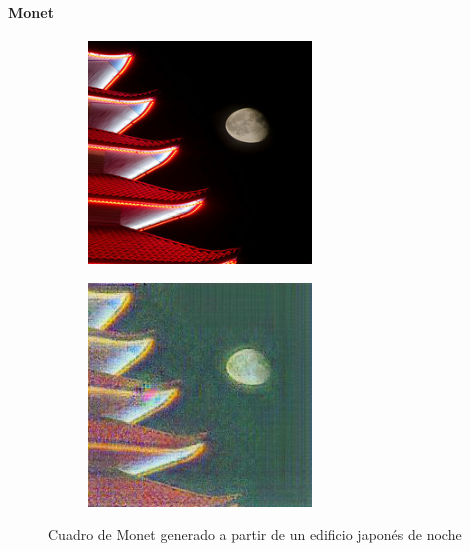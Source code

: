 \documentclass[[../main.tex]{subfiles}
\begin{document}
        \newpage

    \paragraph{Monet}
    
    \begin{figure}[!htb]
            \begin{subfigure}[b]{0.49\textwidth}
            \includegraphics[width=0.65\textwidth]{imagenes/imagen2cuadro/dataset/monet/2014-08-06 15_33_46.jpg}
            \end{subfigure}
        \hfill
            \begin{subfigure}[b]{0.49\textwidth}
            \includegraphics[width=0.65\textwidth]{imagenes/imagen2cuadro/dataset/monet/2014-08-06 15_33_46_2.jpg}
            \end{subfigure}
        \caption{Cuadro de Monet generado a partir de un edificio japonés de noche}
        \label{fig:monet_cuadro_edificio_japones_noche}
        \end{figure}
        
\end{document}
